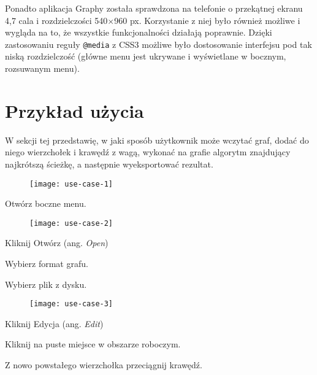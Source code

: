 Ponadto aplikacja Graphy została sprawdzona na telefonie o przekątnej ekranu 4,7 cala i rozdzielczości 540$\times$960 px. Korzystanie z niej było również możliwe i wygląda na to, że wszystkie funkcjonalności działają poprawnie. Dzięki zastosowaniu reguły \texttt{@media} z CSS3 możliwe było dostosowanie interfejsu pod tak niską rozdzielczość (główne menu jest ukrywane i wyświetlane w bocznym, rozsuwanym menu). 

\section{Przykład użycia}

W sekcji tej przedstawię, w jaki sposób użytkownik może wczytać graf, dodać do niego wierzchołek i krawędź z wagą, wykonać na grafie algorytm znajdujący najkrótszą ścieżkę, a następnie wyeksportować rezultat.

\begin{figure}[H]
\centerline{\texttt{[image: use-case-1]}}
\end{figure}
\begin{enumerate}
\begin{footnotesize}
\setlength{\itemsep}{0pt}
\setlength{\parskip}{0pt}
\item Otwórz boczne menu.
\end{footnotesize}
\end{enumerate}

\begin{figure}[H]
\centerline{\texttt{[image: use-case-2]}}
\end{figure}
\begin{enumerate}
\begin{footnotesize}
\setcounter{enumi}{1}
\setlength{\itemsep}{0pt}
\setlength{\parskip}{0pt}
\item Kliknij Otwórz (ang. \textit{Open})
\item Wybierz format grafu.
\item Wybierz plik z dysku.
\end{footnotesize}
\end{enumerate}

\begin{figure}[H]
\centerline{\texttt{[image: use-case-3]}}
\end{figure}
\begin{enumerate}
\begin{footnotesize}
\setcounter{enumi}{4}
\setlength{\itemsep}{0pt}
\setlength{\parskip}{0pt}
\item Kliknij Edycja (ang. \textit{Edit})
\item Kliknij na puste miejsce w obszarze roboczym.
\item Z nowo powstałego wierzchołka przeciągnij krawędź.
\end{footnotesize}
\end{enumerate}

